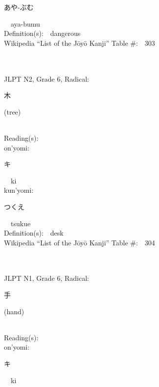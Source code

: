 \begin{multicols}{2}
{\hspace*{2em}}{\begin{CJK}{UTF8}{min} あや-ぶむ \end{CJK}}\ \ aya-bumu\ \ \\
Definition(s):\ \ dangerous \\
Wikipedia ``List of the J\=oy\=o Kanji'' Table \#:\ \ 303 \\
\ \ \\
{\fontsize{34pt}{40pt}  }\ \ \\  %
{JLPT N2, Grade 6, Radical:\ \ {\begin{CJK}{UTF8}{min} 木 \end{CJK}} (tree) } \\
Reading(s):\ \ \\
{\hspace*{1em}}on'yomi:\ \ \\
{\hspace*{2em}}{\begin{CJK}{UTF8}{min} キ \end{CJK}}\ \ ki\ \ \\
{\hspace*{1em}}kun'yomi:\ \ \\
{\hspace*{2em}}{\begin{CJK}{UTF8}{min} つくえ \end{CJK}}\ \ tsukue\ \ \\
Definition(s):\ \ desk \\
Wikipedia ``List of the J\=oy\=o Kanji'' Table \#:\ \ 304 \\
\ \ \\
{\fontsize{34pt}{40pt}  }\ \ \\  %
{JLPT N1, Grade 6, Radical:\ \ {\begin{CJK}{UTF8}{min} 手 \end{CJK}} (hand) } \\
Reading(s):\ \ \\
{\hspace*{1em}}on'yomi:\ \ \\
{\hspace*{2em}}{\begin{CJK}{UTF8}{min} キ \end{CJK}}\ \ ki\ \ \\

\end{multicols}
